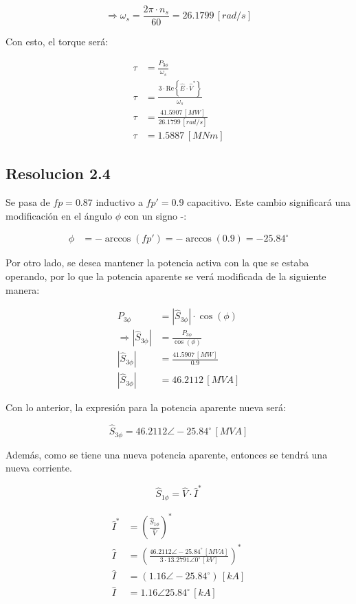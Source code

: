 \documentclass[
  11pt,
  letterpaper,
   addpoints,
   answers
  ]{exam}
\begin{document}
\begin{questions}
\begin{solution}
\[
\Rightarrow \omega_s = \frac{2\pi \cdot n_s}{60} = 26.1799 \, [rad/s]
\]

Con esto, el torque será:

\begin{align}
\tau &= \frac{P_{3\phi}}{\omega_s} \\
\tau &= \frac{3 \cdot \text{Re} \left\{ \hat{E} \cdot \hat{V}^* \right\}}{\omega_s} \\
\tau &= \frac{41.5907 \, [MW]}{26.1799 \, [rad/s]} \\
\tau &= 1.5887 \, [MNm]
\end{align}
\subsection*{Resolucion 2.4}
Se pasa de \( fp = 0.87 \) inductivo a \( fp' = 0.9 \) capacitivo. Este cambio significará una modificación en el ángulo \(\phi\) con un signo -:

\begin{align}
\phi &= - \arccos(fp') = - \arccos(0.9) = -25.84^\circ
\end{align}

Por otro lado, se desea mantener la potencia activa con la que se estaba operando, por lo que la potencia aparente se verá modificada de la siguiente manera:

\begin{align}
P_{3\phi} &= |\hat{S}_{3\phi}| \cdot \cos(\phi) \\
\Rightarrow |\hat{S}_{3\phi}| &= \frac{P_{3\phi}}{\cos(\phi)} \\
|\hat{S}_{3\phi}| &= \frac{41.5907 \, [MW]}{0.9} \\
|\hat{S}_{3\phi}| &= 46.2112 \, [MVA]
\end{align}

Con lo anterior, la expresión para la potencia aparente nueva será:

\[
\hat{S}_{3\phi} = 46.2112 \angle -25.84^\circ \, [MVA]
\]

Además, como se tiene una nueva potencia aparente, entonces se tendrá una nueva corriente.

\[
\hat{S}_{1\phi} = \hat{V} \cdot \hat{I}^*
\]

\begin{align}
\hat{I}^* &= \left( \frac{\hat{S}_{1\phi}}{\hat{V}} \right)^* \\
\hat{I} &= \left( \frac{46.2112 \angle -25.84^\circ \, [MVA]}{3 \cdot 13.2791 \angle 0^\circ \, [kV]} \right)^* \\
\hat{I} &= (1.16 \angle -25.84^\circ) \, [kA] \\
\hat{I} &= 1.16 \angle 25.84^\circ \, [kA]
\end{align}


\end{solution}
\end{questions}
\end{document}
